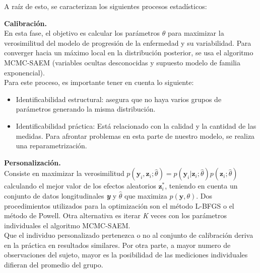 	A raíz de esto, se caracterizan los siguientes procesos estadísticos:
	\begin{description}
		\item {\textbf{Calibración.}}\\
		En esta fase, el objetivo es calcular los parámetros $\hat{\theta}$ para maximizar la verosimilitud del modelo de progresión de la enfermedad y su variabilidad. Para converger hacia un máximo local en la distribución posterior, se usa el algoritmo MCMC-SAEM (variables ocultas desconocidas y supuesto modelo de familia exponencial). \\
		
		Para este proceso, es importante tener en cuenta lo siguiente:
		\begin{itemize}
			\item Identificabilidad estructural: asegura que no haya varios grupos de parámetros generando la misma distribución.
			\item Identificabilidad práctica: Está relacionado con la calidad y la cantidad de las medidas. Para afrontar problemas en esta parte de nuestro modelo, se realiza una reparametrización.
		\end{itemize}
		\item {\textbf{Personalización.}}\\
		Consiste en maximizar la verosimilitud $p(\mathbf{y}_{i}, \mathbf{z}_{i};\hat{\theta})=p(\mathbf{y}_{i}| \mathbf{z}_{i};\hat{\theta})p( \mathbf{z}_{i};\hat{\theta})$ calculando el mejor valor de los efectos aleatorios $\mathbf{z}_{i}^{*}$, teniendo en cuenta un conjunto de datos longitudinales \textit{\textbf{y}} y $\hat{\theta}$ que maximiza $p(\mathbf{y},\theta)$. Dos procedimientos utilizados para la optimización son el método L-BFGS o el método de Powell. Otra alternativa es iterar \textit{K} veces con los parámetros individuales el algoritmo MCMC-SAEM.\\
		
		Que el individuo personalizado pertenezca o no al conjunto de calibración deriva en la práctica en resultados similares. Por otra parte, a mayor numero de observaciones del sujeto, mayor es la posibilidad de las mediciones individuales difieran del promedio del grupo.	
		

\end{description}

